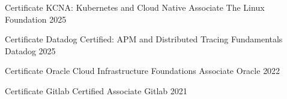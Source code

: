 

\begin{cvhonors}

\cvhonor
  {Certificate} %
  {KCNA: Kubernetes and Cloud Native Associate} %
  {The Linux Foundation} %
  {2025} %

\cvhonor
  {Certificate} %
  {Datadog Certified: APM and Distributed Tracing Fundamentals} %
  {Datadog} %
  {2025} %


\cvhonor
  {Certificate} %
  {Oracle Cloud Infrastructure Foundations Associate} %
  {Oracle} %
  {2022} %



  \cvhonor
    {Certificate} %
    {Gitlab Certified Associate} %
    {Gitlab} %
    {2021} %




\end{cvhonors}

